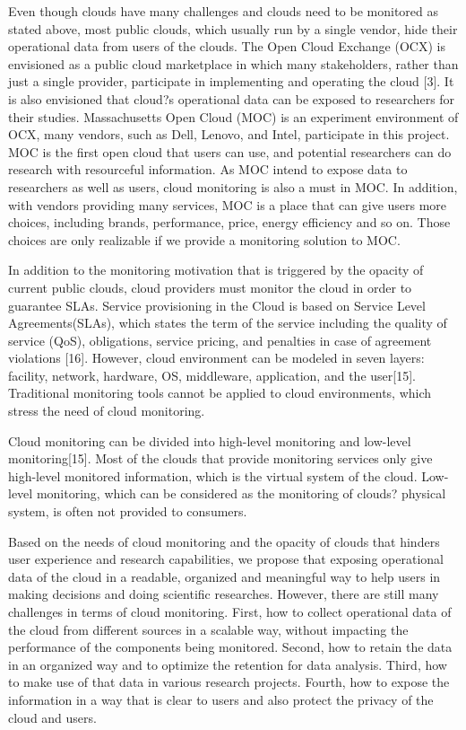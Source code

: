   Even though clouds have many challenges and clouds need to be monitored as stated above, most public clouds, which usually run by a single vendor, hide their operational data from users of the clouds. The Open Cloud Exchange (OCX) is envisioned as a public cloud marketplace in which many stakeholders, rather than just a single provider, participate in implementing and operating the cloud [3]. It is also envisioned that cloud?s operational data can be exposed to researchers for their studies. Massachusetts Open Cloud (MOC) is an experiment environment of OCX, many vendors, such as Dell, Lenovo, and Intel, participate in this project. MOC is the first open cloud that users can use, and potential researchers can do research with resourceful information. As MOC intend to expose data to researchers as well as users, cloud monitoring is also a must in MOC. In addition, with vendors providing many services, MOC is a place that can give users more choices, including brands, performance, price, energy efficiency and so on. Those choices are only realizable if we provide a monitoring solution to MOC. 

  In addition to the monitoring motivation that is triggered by the opacity of current public clouds, cloud providers must monitor the cloud in order to guarantee SLAs. Service provisioning in the Cloud is based on Service Level Agreements(SLAs), which states the term of the service including the quality of service (QoS), obligations, service pricing, and penalties in case of agreement violations [16]. However, cloud environment can be modeled in seven layers: facility, network, hardware, OS, middleware, application, and the user[15]. Traditional monitoring tools cannot be applied to cloud environments, which stress the need of cloud monitoring.

  Cloud monitoring can be divided into high-level monitoring and low-level monitoring[15]. Most of the clouds that provide monitoring services only give high-level monitored information, which is the virtual system of the cloud. Low-level monitoring, which can be considered as the monitoring of clouds? physical system, is often not provided to consumers. 

  Based on the needs of cloud monitoring and the opacity of clouds that hinders user experience and research capabilities, we propose that exposing operational data of the cloud in a readable, organized and meaningful way to help users in making decisions and doing scientific researches. However, there are still many challenges in terms of cloud monitoring. First, how to collect operational data of the cloud from different sources in a scalable way, without impacting the performance of the components being monitored. Second, how to retain the data in an organized way and to optimize the retention for data analysis. Third, how to make use of that data in various research projects. Fourth, how to expose the information in a way that is clear to users and also protect the privacy of the cloud and users. 


